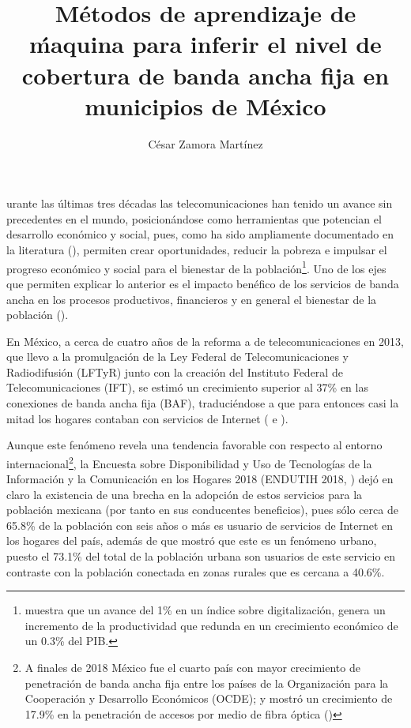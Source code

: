 \documentclass[9pt,twocolumn,twoside]{ilcss}
\title{M\'etodos de aprendizaje de \'maquina para inferir el nivel de cobertura de banda ancha fija en municipios  de M\'exico}
\author[a]{C\'esar Zamora Mart\'inez}
\affil[a]{Alumno de Maestr\'ia en Ciencias de Datos (ITAM)}
\begin{document}
\maketitle
\thispagestyle{firststyle}


urante las últimas tres décadas las telecomunicaciones han tenido un avance sin precedentes en el mundo, posicionándose como herramientas que potencian el desarrollo económico y social, pues, como ha sido ampliamente documentado en la literatura (\cite{PRADHAN2014634}), permiten crear oportunidades, reducir la pobreza e impulsar el progreso económico y social para el bienestar de la población\footnote{\cite{Katz2018} muestra que un avance del 1\% en un índice sobre digitalización, genera un incremento de la productividad que redunda en un crecimiento económico de un 0.3\% del PIB. }. Uno de los ejes que permiten explicar lo anterior es el impacto benéfico de los servicios de banda ancha en los procesos productivos, financieros y en general el bienestar de la población (\cite{Katz2012}).

En México, a cerca de cuatro años de la reforma a de telecomunicaciones en 2013, que llevo a la promulgación de la Ley Federal de Telecomunicaciones y Radiodifusión (LFTyR) junto con la creación del Instituto Federal de Telecomunicaciones (IFT), se estimó un crecimiento superior al 37\% en las conexiones de banda ancha fija (BAF), traduciéndose a que para entonces casi la mitad los hogares contaban con servicios de Internet (\cite{IFT2017} e \cite{IFT2018}).

Aunque este fenómeno revela una tendencia favorable con respecto al entorno internacional\footnote{A finales de 2018 México fue el cuarto país con mayor crecimiento de penetración de banda ancha fija entre los países de la Organización para la Cooperación y Desarrollo Económicos (OCDE); y mostró un crecimiento de 17.9\% en la penetración de accesos por medio de fibra óptica (\cite{IFT2019})}, la Encuesta sobre Disponibilidad y Uso de Tecnologías de la Información y la Comunicación en los Hogares 2018 (ENDUTIH 2018, \cite{ENDUTIH2018}) dejó en claro la existencia de una brecha en la adopción de estos servicios para la población mexicana (por tanto en sus conducentes beneficios), pues sólo cerca de 65.8\% de la población con seis años o más es usuario de servicios de Internet en los hogares del país, además de que mostró que este es un fenómeno urbano, puesto el 73.1\% del total de la población urbana son usuarios de este servicio en contraste con la población conectada en zonas rurales que es cercana a 40.6\%.
\end{document}
